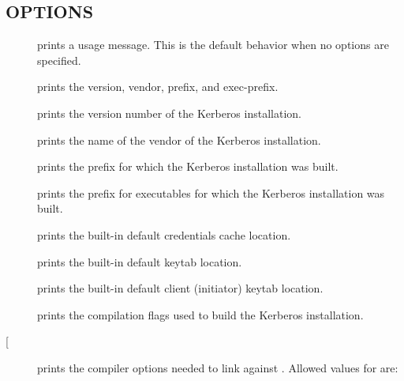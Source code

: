 \documentclass[letterpaper,10pt,english]{sphinxmanual}
\begin{document}
\subsection{OPTIONS}
\label{\detokenize{user/user_commands/krb5-config:options}}\begin{description}
\item[{\sphinxstylestrong{-}}] \leavevmode
prints a usage message.  This is the default behavior when no options
are specified.

\item[{\sphinxstylestrong{-}}] \leavevmode
prints the version, vendor, prefix, and exec-prefix.

\item[{\sphinxstylestrong{-}}] \leavevmode
prints the version number of the Kerberos installation.

\item[{\sphinxstylestrong{-}}] \leavevmode
prints the name of the vendor of the Kerberos installation.

\item[{\sphinxstylestrong{-}}] \leavevmode
prints the prefix for which the Kerberos installation was built.

\item[{\sphinxstylestrong{-}}] \leavevmode
prints the prefix for executables for which the Kerberos installation
was built.

\item[{\sphinxstylestrong{-}}] \leavevmode
prints the built-in default credentials cache location.

\item[{\sphinxstylestrong{-}}] \leavevmode
prints the built-in default keytab location.

\item[{\sphinxstylestrong{-}}] \leavevmode
prints the built-in default client (initiator) keytab location.

\item[{\sphinxstylestrong{-}}] \leavevmode
prints the compilation flags used to build the Kerberos installation.

\item[{\sphinxstylestrong{-} {[}\sphinxstyleemphasis{library}{]}}] \leavevmode
prints the compiler options needed to link against .
Allowed values for  are:



\end{description}
\end{document}
